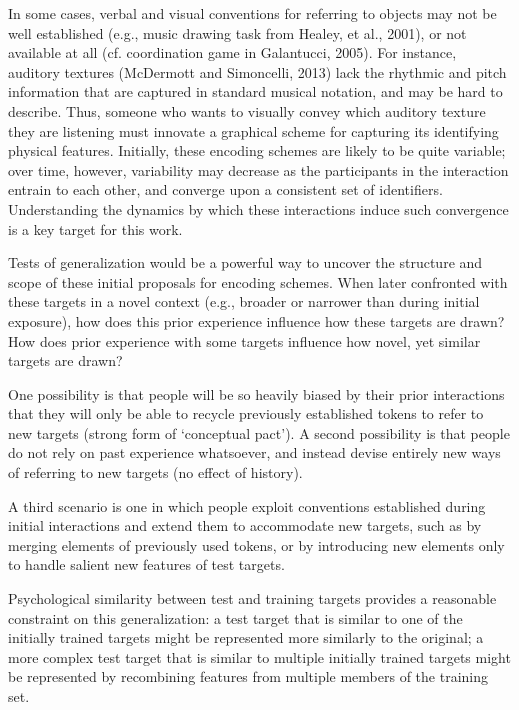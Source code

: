 \documentclass[12pt]{article}
\begin{document}
In some cases, verbal and visual conventions for referring to objects may not be well established (e.g., music drawing task from Healey, et al., 2001), or not available at all (cf. coordination game in Galantucci, 2005). For instance, auditory textures (McDermott and Simoncelli, 2013) lack the rhythmic and pitch information that are captured in standard musical notation, and may be hard to describe. Thus, someone who wants to visually convey which auditory texture they are listening must innovate a graphical scheme for capturing its identifying physical features. Initially, these encoding schemes are likely to be quite variable; over time, however, variability may decrease as the participants in the interaction entrain to each other, and converge upon a consistent set of identifiers. Understanding the dynamics by which these interactions induce such convergence is a key target for this work. 

Tests of generalization would be a powerful way to uncover the structure and scope of these initial proposals for encoding schemes. When later confronted with these targets in a novel context (e.g., broader or narrower than during initial exposure), how does this prior experience influence how these targets are drawn? How does prior experience with some targets influence how novel, yet similar targets are drawn?

One possibility is that people will be so heavily biased by their prior interactions that they will only be able to recycle previously established tokens to refer to new targets (strong form of `conceptual pact'). A second possibility is that people do not rely on past experience whatsoever, and instead devise entirely new ways of referring to new targets (no effect of history). 

A third scenario is one in which people exploit conventions established during initial interactions and extend them to accommodate new targets, such as by merging elements of previously used tokens, or by introducing new elements only to handle salient new features of test targets. 

Psychological similarity between test and training targets provides a reasonable constraint on this generalization: a test target that is similar to one of the initially trained targets might be represented more similarly to the original; a more complex test target that is similar to multiple initially trained targets might be represented by recombining features from multiple members of the training set. 
\end{document}

